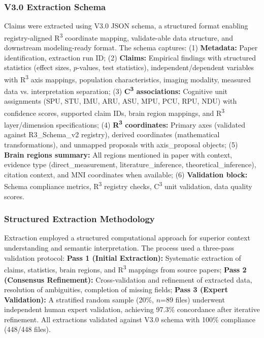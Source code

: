 \documentclass[9pt,onecolumn]{article}
\begin{document}
\subsubsection{V3.0 Extraction Schema}

Claims were extracted using V3.0 JSON schema, a structured format enabling registry-aligned R\textsuperscript{3} coordinate mapping, validate-able data structure, and downstream modeling-ready format. The schema captures: (1) \textbf{Metadata:} Paper identification, extraction run ID; (2) \textbf{Claims:} Empirical findings with structured statistics (effect sizes, $p$-values, test statistics), independent/dependent variables with R\textsuperscript{3} axis mappings, population characteristics, imaging modality, measured data vs. interpretation separation; (3) \textbf{C\textsuperscript{3} associations:} Cognitive unit assignments (SPU, STU, IMU, ARU, ASU, MPU, PCU, RPU, NDU) with confidence scores, supported claim IDs, brain region mappings, and R\textsuperscript{3} layer/dimension specifications; (4) \textbf{R\textsuperscript{3} coordinates:} Primary axes (validated against R3\_Schema\_v2 registry), derived coordinates (mathematical transformations), and unmapped proposals with axis\_proposal objects; (5) \textbf{Brain regions summary:} All regions mentioned in paper with context, evidence type (direct\_measurement, literature\_inference, theoretical\_inference), citation context, and MNI coordinates when available; (6) \textbf{Validation block:} Schema compliance metrics, R\textsuperscript{3} registry checks, C\textsuperscript{3} unit validation, data quality scores.

\subsubsection{Structured Extraction Methodology}

Extraction employed a structured computational approach for superior context understanding and semantic interpretation. The process used a three-pass validation protocol: \textbf{Pass 1 (Initial Extraction):} Systematic extraction of claims, statistics, brain regions, and R\textsuperscript{3} mappings from source papers; \textbf{Pass 2 (Consensus Refinement):} Cross-validation and refinement of extracted data, resolution of ambiguities, completion of missing fields; \textbf{Pass 3 (Expert Validation):} A stratified random sample (20\%, $n$=89 files) underwent independent human expert validation, achieving 97.3\% concordance after iterative refinement. All extractions validated against V3.0 schema with 100\% compliance (448/448 files).
\end{document}
